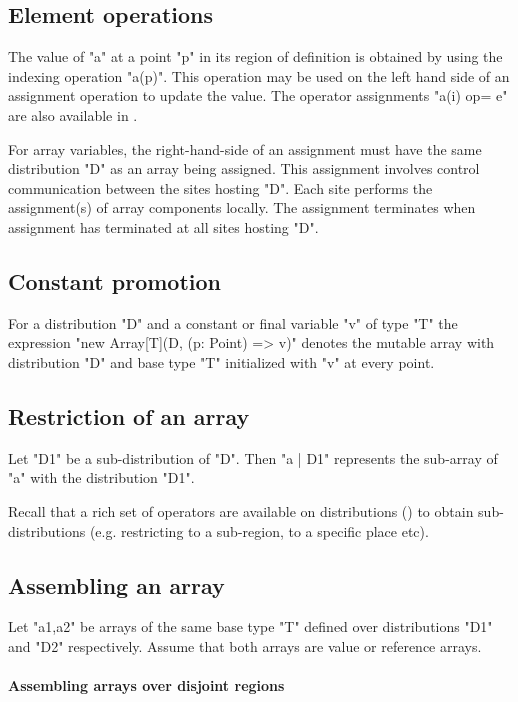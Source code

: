 \subsection{Element operations}
The value of \xcd"a" at a point \xcd"p" in its region of definition is
obtained by using the indexing operation \xcd"a(p)". This operation
may be used on the left hand side of an assignment operation to update
the value. The operator assignments \xcd"a(i) op= e" are also available
in \Xten{}.

For array variables, the right-hand-side of an assignment must
have the same distribution \xcd"D" as an array being assigned. This
assignment involves
control communication between the sites hosting \xcd"D". Each
site performs the assignment(s) of array components locally. The
assignment terminates when assignment has terminated at all
sites hosting \xcd"D".

\subsection{Constant promotion}\label{ConstantArray}

For a distribution \xcd"D" and a constant or final variable \xcd"v" of
type \xcd"T" the expression \xcd"new Array[T](D, (p: Point) => v)"
denotes the mutable array with
distribution \xcd"D" and base type \xcd"T" initialized with \xcd"v"
at every point.

\subsection{Restriction of an array}

Let \xcd"D1" be a sub-distribution of \xcd"D". Then \xcd"a | D1"
represents the sub-array of \xcd"a" with the distribution \xcd"D1".

Recall that a rich set of operators are available on distributions
() to obtain sub-distributions
(e.g. restricting to a sub-region, to a specific place etc).

\subsection{Assembling an array}
Let \xcd"a1,a2" be arrays of the same base type \xcd"T" defined over
distributions \xcd"D1" and \xcd"D2" respectively. Assume that both
arrays are value or reference arrays. 
\paragraph{Assembling arrays over disjoint regions}

